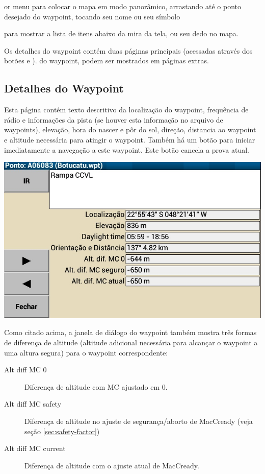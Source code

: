 or menu \blink{} para colocar o mapa em modo panorâmico, arrastando até o ponto desejado do waypoint, tocando seu nome ou seu símbolo

\blink{}
para mostrar a lista de itens abaixo da mira da tela, ou seu dedo no mapa.


Os detalhes do waypoint contém duas páginas principais (acessadas através dos botões 
\bmenuw{$>$} e \bmenuw{$<$}). do waypoint, podem ser mostrados em páginas extras.

\subsection*{Detalhes do Waypoint}
\label{sec:waypointdetails}
Esta página contém texto descritivo da localização do waypoint, frequência de rádio e informações da pista (se houver esta informação no arquivo de waypoints), elevação, hora do nascer e pôr do sol, direção, distancia ao waypoint e altitude necessária para atingir o waypoint. Também há um botão 
 para iniciar imediatamente a navegação a este waypoint.  Este botão cancela a prova atual.

\begin{center}
\includegraphics[angle=0,width=0.8\linewidth,keepaspectratio='true']{figures/dialog-waypointdetails0.png}
\end{center}

Como citado acima, a janela de diálogo do waypoint também mostra três formas de diferença de altitude (altitude adicional necessária para alcançar o waypoint a uma altura segura) para o waypoint correspondente:
\begin{description}
\item[Alt diff MC 0] Diferença de altitude com MC ajustado em 0.
\item[Alt diff MC safety] Diferença de altitude no ajuste de segurança/aborto de MacCready (veja seção  \ref{sec:safety-factor})
\item[Alt diff MC current] Diferença de altitude com o ajuste atual de MacCready.
\end{description}

